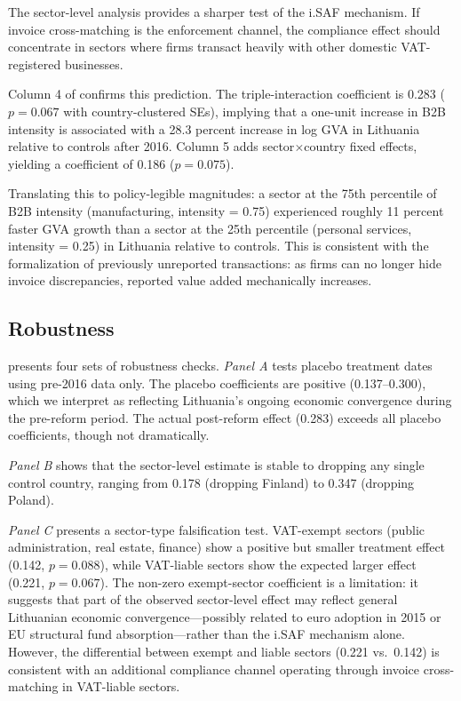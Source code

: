 \documentclass[12pt]{article}
\begin{document}
The sector-level analysis provides a sharper test of the i.SAF mechanism. If invoice cross-matching is the enforcement channel, the compliance effect should concentrate in sectors where firms transact heavily with other domestic VAT-registered businesses.

Column 4 of  confirms this prediction. The triple-interaction coefficient is 0.283 ($p = 0.067$ with country-clustered SEs), implying that a one-unit increase in B2B intensity is associated with a 28.3 percent increase in log GVA in Lithuania relative to controls after 2016. Column 5 adds sector$\times$country fixed effects, yielding a coefficient of 0.186 ($p = 0.075$).

Translating this to policy-legible magnitudes: a sector at the 75th percentile of B2B intensity (manufacturing, intensity = 0.75) experienced roughly 11 percent faster GVA growth than a sector at the 25th percentile (personal services, intensity = 0.25) in Lithuania relative to controls. This is consistent with the formalization of previously unreported transactions: as firms can no longer hide invoice discrepancies, reported value added mechanically increases.

\subsection{Robustness}

 presents four sets of robustness checks. \textit{Panel A} tests placebo treatment dates using pre-2016 data only. The placebo coefficients are positive (0.137--0.300), which we interpret as reflecting Lithuania's ongoing economic convergence during the pre-reform period. The actual post-reform effect (0.283) exceeds all placebo coefficients, though not dramatically.

\textit{Panel B} shows that the sector-level estimate is stable to dropping any single control country, ranging from 0.178 (dropping Finland) to 0.347 (dropping Poland).

\textit{Panel C} presents a sector-type falsification test. VAT-exempt sectors (public administration, real estate, finance) show a positive but smaller treatment effect (0.142, $p = 0.088$), while VAT-liable sectors show the expected larger effect (0.221, $p = 0.067$). The non-zero exempt-sector coefficient is a limitation: it suggests that part of the observed sector-level effect may reflect general Lithuanian economic convergence---possibly related to euro adoption in 2015 or EU structural fund absorption---rather than the i.SAF mechanism alone. However, the differential between exempt and liable sectors (0.221 vs.\ 0.142) is consistent with an additional compliance channel operating through invoice cross-matching in VAT-liable sectors.
\end{document}
